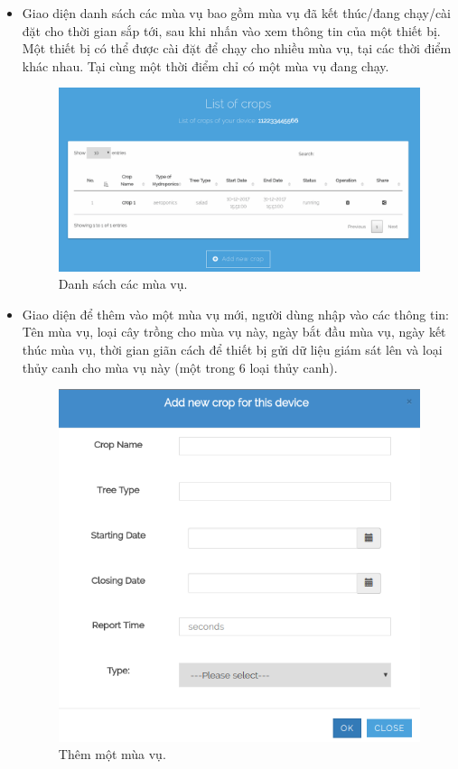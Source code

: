 \documentclass[a4paper,12pt,oneside]{article}
\begin{document}
\begin{itemize}
\item Giao diện danh sách các mùa vụ bao gồm mùa vụ đã kết thúc/đang chạy/cài đặt cho thời gian sắp tới, sau khi nhấn vào xem thông tin của một thiết bị. Một thiết bị có thể được cài đặt để chạy cho nhiều mùa vụ, tại các thời điểm khác nhau. Tại cùng một thời điểm chỉ có một mùa vụ đang chạy. 
\begin{figure}[H]
\centering
\includegraphics[scale=.4]{hinh/web_crop_list.png}
\caption{Danh sách các mùa vụ.}
\end{figure}

\item Giao diện để thêm vào một mùa vụ mới, người dùng nhập vào các thông tin: Tên mùa vụ, loại cây trồng cho mùa vụ này, ngày bắt đầu mùa vụ, ngày kết thúc mùa vụ, thời gian giãn cách để thiết bị gửi dữ liệu giám sát lên và loại thủy canh cho mùa vụ này (một trong 6 loại thủy canh).
\begin{figure}[H]
\centering
\includegraphics[scale=.55]{hinh/web_add_crop.png}
\caption{Thêm một mùa vụ.}
\end{figure}


\end{itemize}
\end{document}
